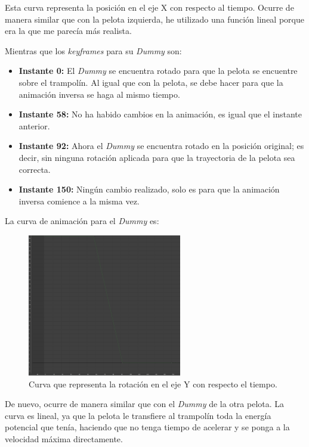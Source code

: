 Esta curva representa la posición en el eje X con respecto al tiempo. Ocurre de manera similar que con la pelota izquierda, he utilizado una función lineal porque era la que me parecía más realista.

\bigskip

Mientras que los \textit{keyframes} para su \textit{Dummy} son:

\begin{itemize}
    \item \textbf{Instante 0: }El \textit{Dummy} se encuentra rotado para que la pelota se encuentre sobre el trampolín. Al igual que con la pelota, se debe hacer para que la animación inversa se haga al mismo tiempo.
    \item \textbf{Instante 58: }No ha habido cambios en la animación, es igual que el instante anterior.
    \item \textbf{Instante 92: }Ahora el \textit{Dummy} se encuentra rotado en la posición original; es decir, sin ninguna rotación aplicada para que la trayectoria de la pelota sea correcta.
    \item \textbf{Instante 150: }Ningún cambio realizado, solo es para que la animación inversa comience a la misma vez.
\end{itemize}

\newpage

La curva de animación para el \textit{Dummy} es:

\begin{figure}[H]
    \centering
    \includegraphics[width=0.6\textwidth]{imagenes/curvas/PR/dummy/green.png}
    \caption{Curva que representa la rotación en el eje Y con respecto el tiempo.}
 \end{figure}

De nuevo, ocurre de manera similar que con el \textit{Dummy} de la otra pelota. La curva es lineal, ya que la pelota le transfiere al trampolín toda la energía potencial que tenía, haciendo que no tenga tiempo de acelerar y se ponga a la velocidad máxima directamente.

